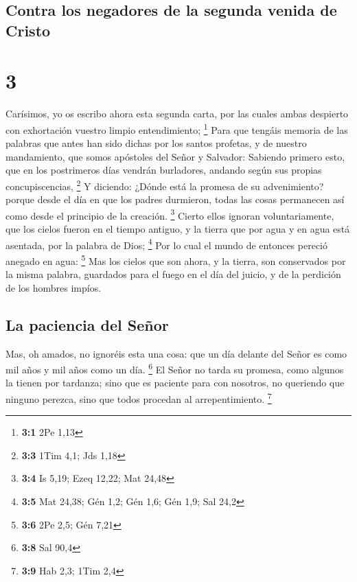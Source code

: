 \hypertarget{contra-los-negadores-de-la-segunda-venida-de-cristo}{%
\subsection{Contra los negadores de la segunda venida de
Cristo}\label{contra-los-negadores-de-la-segunda-venida-de-cristo}}

\hypertarget{section-2}{%
\section{3}\label{section-2}}

 Carísimos, yo os escribo ahora esta segunda carta, por
las cuales ambas despierto con exhortación vuestro limpio entendimiento;
\footnote{\textbf{3:1} 2Pe 1,13}  Para que tengáis memoria
de las palabras que antes han sido dichas por los santos profetas, y de
nuestro mandamiento, que somos apóstoles del Señor y Salvador:
 Sabiendo primero esto, que en los postrimeros días
vendrán burladores, andando según sus propias concupiscencias,
\footnote{\textbf{3:3} 1Tim 4,1; Jds 1,18}  Y diciendo:
¿Dónde está la promesa de su advenimiento? porque desde el día en que
los padres durmieron, todas las cosas permanecen así como desde el
principio de la creación. \footnote{\textbf{3:4} Is 5,19; Ezeq 12,22;
  Mat 24,48}  Cierto ellos ignoran voluntariamente, que
los cielos fueron en el tiempo antiguo, y la tierra que por agua y en
agua está asentada, por la palabra de Dios; \footnote{\textbf{3:5} Mat
  24,38; Gén 1,2; Gén 1,6; Gén 1,9; Sal 24,2}  Por lo cual
el mundo de entonces pereció anegado en agua: \footnote{\textbf{3:6} 2Pe
  2,5; Gén 7,21}  Mas los cielos que son ahora, y la
tierra, son conservados por la misma palabra, guardados para el fuego en
el día del juicio, y de la perdición de los hombres impíos.

\hypertarget{la-paciencia-del-seuxf1or}{%
\subsection{La paciencia del Señor}\label{la-paciencia-del-seuxf1or}}

 Mas, oh amados, no ignoréis esta una cosa: que un día
delante del Señor es como mil años y mil años como un día. \footnote{\textbf{3:8}
  Sal 90,4}  El Señor no tarda su promesa, como algunos la
tienen por tardanza; sino que es paciente para con nosotros, no
queriendo que ninguno perezca, sino que todos procedan al
arrepentimiento. \footnote{\textbf{3:9} Hab 2,3; 1Tim 2,4}

